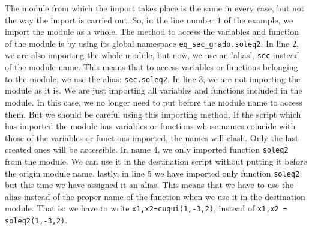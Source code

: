 \begin{paracol}{2}
The module from which the import takes place is the same in every case, but not the way the import is carried out. So, in the line number $1$ of the example, we import the module as a whole. The method to access the variables and function of the module is by using its global namespace  \texttt{eq_sec_grado.soleq2}. In line $2$, we are also importing the whole module, but now, we use an 'alias', \texttt{sec} instead of the module name. This means that to access variables or functions belonging to the module, we use the alias: \texttt{sec.soleq2}. In line $3$, we are not importing the module as it is. We are just importing all variables and functions included in the module. In this case, we no longer need to put before the module name to access them.  But we should be careful using this importing method. If the script which has imported the module has variables or functions whose names coincide with those of the variables or functions imported, the names will clash. Only the last created ones will be accessible. In name $4$, we only imported function \texttt{soleq2} from the module. We can use it in the destination script without putting it before the origin module name. lastly, in line $5$  we have imported only function \texttt{soleq2} but this time we have assigned it an alias. This means that we have to use the alias instead of the proper name of the function when we use it in the destination module. That is: we have to write \texttt{x1,x2=cuqui(1,-3,2)}, instead of \texttt{x1,x2 = soleq2(1,-3,2)}.        
\end{paracol}
